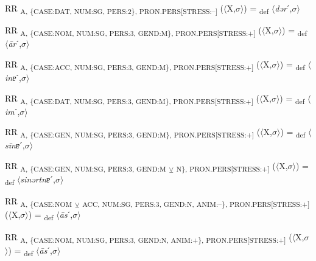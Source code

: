 {\begin{exe}
 RR \textsubscript{A, \{CASE:DAT, NUM:SG, PERS:2\}, PRON.PERS[STRESS:–]} ($\langle$X,$\sigma $$\rangle$) = \textsubscript{def} $\langle$\textit{dər}ˊ,$\sigma $$\rangle$
\end{exe}

\begin{exe}
 RR \textsubscript{A, \{CASE:NOM, NUM:SG, PERS:3, GEND:M\}, PRON.PERS[STRESS:+]} ($\langle$X,$\sigma $$\rangle$) = \textsubscript{def} $\langle$\textit{\=ar}ˊ,$\sigma $$\rangle$
\end{exe}

\begin{exe}
 RR \textsubscript{A, \{CASE:ACC, NUM:SG, PERS:3, GEND:M\}, PRON.PERS[STRESS:+]} ($\langle$X,$\sigma $$\rangle$) = \textsubscript{def} $\langle$\textit{inɐ}ˊ,$\sigma $$\rangle$
\end{exe}

\begin{exe}
 RR \textsubscript{A, \{CASE:DAT, NUM:SG, PERS:3, GEND:M\}, PRON.PERS[STRESS:+]} ($\langle$X,$\sigma $$\rangle$) = \textsubscript{def} $\langle$\textit{im}ˊ,$\sigma $$\rangle$
\end{exe}

\begin{exe}
 RR \textsubscript{A, \{CASE:GEN, NUM:SG, PERS:3, GEND:M\}, PRON.PERS[STRESS:+]} ($\langle$X,$\sigma $$\rangle$) = \textsubscript{def} $\langle$\textit{s\=inɐ}ˊ,$\sigma $$\rangle$
\end{exe}

\begin{exe}
 RR \textsubscript{A, \{CASE:GEN, NUM:SG, PERS:3, GEND:M} \textsubscript{${\veebar}$}\textsubscript{ N\}, PRON.PERS[STRESS:+]} ($\langle$X,$\sigma $$\rangle$) = \textsubscript{def} $\langle$\textit{sinərtnɐ}ˊ,$\sigma $$\rangle$
\end{exe}

\begin{exe}
 RR \textsubscript{A, \{CASE:NOM} \textsubscript{${\veebar}$}\textsubscript{ ACC, NUM:SG, PERS:3, GEND:N, ANIM:–\}, PRON.PERS[STRESS:+]} ($\langle$X,$\sigma $$\rangle$) = \textsubscript{def} $\langle$\textit{\=as}ˊ,$\sigma $$\rangle$
\end{exe}

\begin{exe}
 RR \textsubscript{A, \{CASE:NOM, NUM:SG, PERS:3, GEND:N, ANIM:+\}, PRON.PERS[STRESS:+]} ($\langle$X,$\sigma $$\rangle$) = \textsubscript{def} $\langle$\textit{\=as}ˊ,$\sigma $$\rangle$
\end{exe}

}
